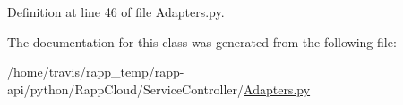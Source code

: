 Definition at line 46 of file Adapters.\-py.



The documentation for this class was generated from the following file\-:\begin{DoxyCompactItemize}
\item 
/home/travis/rapp\-\_\-temp/rapp-\/api/python/\-Rapp\-Cloud/\-Service\-Controller/\hyperlink{Adapters_8py}{Adapters.\-py}\end{DoxyCompactItemize}
